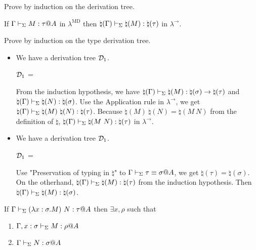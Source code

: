 Prove by induction on the derivation tree.

\begin{lemma}
	If $\G \V M:\tau@A$ in $\lambda^{\text{MD}}$ then $\natural(\Gamma) \vdash_\Sigma \natural(M): \natural(\tau)$ in $\lambda^\to$.
\end{lemma}

Prove by induction on the type derivation tree.

\begin{itemize}
	\item \TApp
	      	      
	      We have a derivation tree $\mathcal{D}_1$.
	      	      
	      $\mathcal{D}_1$ = 
	      { \andalso {}}
	      	      
	      From the induction hypothesis, we have $\natural(\Gamma) \vdash_\Sigma \natural(M) : \natural(\sigma) \to \natural(\tau)$ and $\natural(\Gamma) \vdash_\Sigma \natural(N) : \natural(\sigma)$.
	      Use the Application rule in $\lambda^\to$, we get $\natural(\G) \V \natural(M)\ \natural(N) : \natural(\tau)$.
	      Because $\natural(M)\ \natural(N) = \natural(M\ N)$ from the definition of $\natural$, $\natural(\Gamma) \vdash_\Sigma \natural(M\ N) : \natural(\tau)$ in $\lambda^\to$.
	\item \TConv
	      	      
	      We have a derivation tree $\mathcal{D}_1$.
	      	      
	      $\mathcal{D}_1$ = 
	      { \andalso \ID{\G\V \tau\E\sigma@A}}
	      	      
	      Use "Preservation of typing in $\natural$" to $\G\V \tau\E\sigma@A$, we get $\natural(\tau) = \natural(\sigma)$.
	      On the otherhand, $\natural(\Gamma) \vdash_\Sigma \natural(M):\natural(\tau)$ from the induction hypothesis.
	      Then $\natural(\Gamma) \vdash_\Sigma \natural(M):\natural(\sigma)$.
	      	      
\end{itemize}

\begin{lemma}
	\begin{item}
	      \item If $\G \V (\lambda x:\sigma.M)\ N: \tau@A$ then $\exists x, \rho$ such that
	      \begin{enumerate}
	      	\item $\Gamma, x:\sigma \vdash_\Sigma M : \rho @A$
	      	\item $\Gamma \vdash_\Sigma N:\sigma @ A$
	      \end{enumerate}
	\end{item}
\end{lemma}

